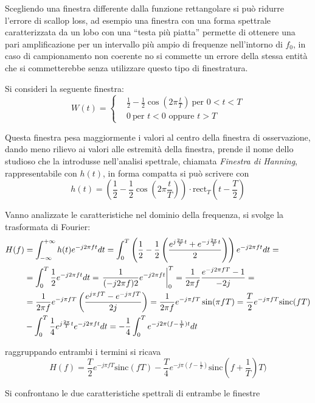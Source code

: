 Scegliendo una finestra differente dalla funzione rettangolare si può ridurre
l'errore di scallop loss, ad esempio una finestra con una forma spettrale
caratterizzata da un lobo con una ``testa più piatta'' permette di ottenere una
pari amplificazione per un intervallo più ampio di frequenze nell'intorno di
$f_0$, in caso di campionamento non coerente no si commette un errore della
stessa entità che si commetterebbe senza utilizzare questo tipo di finestratura.

Si consideri la seguente finestra:
$$W(t) =\begin{cases}
 & \frac{1}{2} - \frac{1}{2}\cos(2\pi \frac{t}{T})\ \text{per } 0<t<T\\
&0 \ \text{per } t<0 \text{ oppure } t>T
\end{cases}
$$

Questa finestra pesa maggiormente i valori al centro della finestra di
osservazione, dando meno rilievo ai valori alle estremità della finestra,
prende il nome dello studioso che la introdusse nell'analisi spettrale,
chiamata \textit{Finestra di Hanning}, rappresentabile con $h(t)$, in forma
compatta si può scrivere con
$$
h(t) = \left(\frac{1}{2}-\frac{1}{2}\cos\left( 2\pi \frac{t}{T}
\right)\right)\cdot \text{rect}_T\left(t-\frac{T}{2}\right)
$$

Vanno analizzate le caratteristiche nel dominio della frequenza, si svolge la
trasformata di Fourier:
$$\begin{aligned}
H(f) &= \int_{-\infty}^{+\infty} h(t) e^{-j2\pi ft} dt = \int_0^T
\left(\frac{1}{2}-\frac{1}{2}\left( \frac{e^{j\frac{2\pi}{T}t}
+e^{-j\frac{2\pi}{T}t}}{2} \right) \right)e^{-j2\pi ft} dt =\\
& = \int_0^T \frac{1}{2}e^{-j2\pi ft} dt = \left.\frac{1}{(-j2\pi f)2}e^{-j2\pi
ft} \right|_0^T = \frac{1}{2\pi f} \frac{e^{-j2\pi fT} -1}{-2j} =\\
&= \frac{1}{2\pi f} e^{-j\pi fT} \left( \frac{e^{j\pi f T}-e^{-j\pi f T}}{2j}
\right) = \frac{1}{2\pi f}e^{-j\pi fT} \sin(\pi f T) = \frac{T}{2} e^{-j\pi f
T} \text{sinc}(fT) \\
&- \int_0^T \frac{1}{4} e^{j\frac{2\pi}{T}t} e^{-j2\pi ft}dt = -\frac{1}{4}
\int_0^T e^{-j2\pi (f-\frac{1}{T})t} dt
\end{aligned}
$$

raggruppando entrambi i termini si ricava
$$
H(f) = \frac{T}{2}e^{-j\pi fT}\text{sinc}(fT) - \frac{T}{4} e^{-j\pi
(f-\frac{1}{T})}\text{sinc}(f+\frac{1}{T})T) %
$$

Si confrontano le due caratteristiche spettrali di entrambe le finestre


